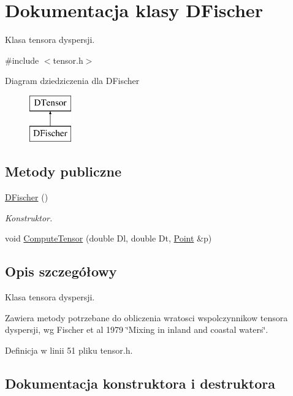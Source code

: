 \hypertarget{class_d_fischer}{}\section{Dokumentacja klasy D\+Fischer}
\label{class_d_fischer}


Klasa tensora dyspersji.  




{\ttfamily \#include $<$tensor.\+h$>$}

Diagram dziedziczenia dla D\+Fischer\begin{figure}[H]
\begin{center}
\leavevmode
\includegraphics[height=2.000000cm]{class_d_fischer}
\end{center}
\end{figure}
\subsection*{Metody publiczne}
\begin{DoxyCompactItemize}
\item 
\hyperlink{class_d_fischer_ae902c6bcee1e0697298aa0ce16063f06}{D\+Fischer} ()
\begin{DoxyCompactList}\small\item\em Konstruktor. \end{DoxyCompactList}\item 
void \hyperlink{class_d_fischer_a683862f1095c7b1c7331621d79360e40}{Compute\+Tensor} (double Dl, double Dt, \hyperlink{class_point}{Point} \&p)
\end{DoxyCompactItemize}


\subsection{Opis szczegółowy}
Klasa tensora dyspersji. 

Zawiera metody potrzebane do obliczenia wratosci wspolczynnikow tensora dyspersji, wg Fischer et al 1979 \char`\"{}\+Mixing in inland and coastal waters\char`\"{}. 

Definicja w linii 51 pliku tensor.\+h.



\subsection{Dokumentacja konstruktora i destruktora}
\hypertarget{class_d_fischer_ae902c6bcee1e0697298aa0ce16063f06}{}

